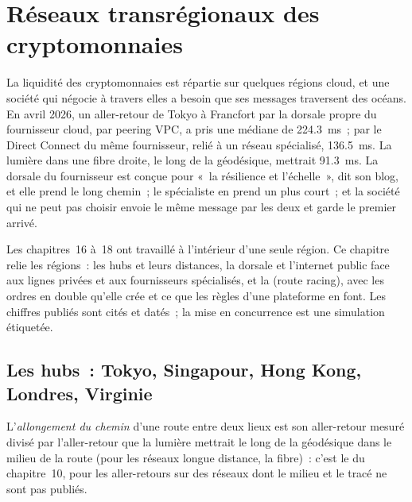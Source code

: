 \chapter{Réseaux transrégionaux des cryptomonnaies}\label{ch:nw:cross-region-crypto-networks}

La liquidité des cryptomonnaies est répartie sur quelques régions cloud, et une société qui négocie à travers elles a besoin que ses messages traversent des océans. En avril 2026,
un aller-retour de Tokyo à Francfort par la dorsale propre du fournisseur cloud, par peering VPC, a pris une médiane de \qty{224.3}{\milli\second}~;
par le Direct Connect du même fournisseur, relié à un réseau spécialisé, \qty{136.5}{\milli\second}. La lumière dans une fibre droite, le long de la
géodésique, mettrait \qty{91.3}{\milli\second}. La dorsale du fournisseur est conçue pour «~la résilience et l'échelle~», dit son blog, et elle prend le
long chemin~; le spécialiste en prend un plus court~; et la société qui ne peut pas choisir envoie le même message par les deux et garde le premier arrivé.

Les chapitres~16 à~18 ont travaillé à l'intérieur d'une seule région. Ce chapitre relie les régions~: les hubs et leurs distances, la dorsale et
l'internet public face aux lignes privées et aux fournisseurs spécialisés, et la  (route racing), avec les ordres en double
qu'elle crée et ce que les règles d'une plateforme en font. Les chiffres publiés sont cités et datés~; la mise en concurrence est une simulation étiquetée.

\section{Les hubs~: Tokyo, Singapour, Hong Kong, Londres, Virginie}

\begin{definition}\label{def:nw:cross-region-crypto-networks:infl}
L'\emph{allongement du chemin} d'une route entre deux lieux est son aller-retour mesuré divisé par l'aller-retour que la lumière
mettrait le long de la géodésique dans le milieu de la route (pour les réseaux longue distance, la fibre)~: c'est le  du chapitre~10, pour les
aller-retours sur des réseaux dont le milieu et le tracé ne sont pas publiés.
\end{definition}

